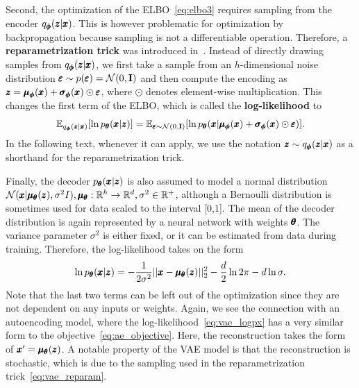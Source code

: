 Second, the optimization of the ELBO~\eqref{eq:elbo3} requires sampling from the encoder $q_{\pmb{{\phi}}}(\pmb{{z}}|\pmb{{x}})$. This is however problematic for optimization by backpropagation because sampling is not a differentiable operation. Therefore, a \textbf{reparametrization trick} was introduced in~\cite{kingma2013vae}. Instead of directly drawing samples from $q_{\pmb{{\phi}}}(\pmb{{z}}|\pmb{{x}})$, we first take a sample from an $h$-dimensional noise distribution $\pmb{{\varepsilon}}\sim p(\pmb{{\varepsilon}})=\mathcal{N}(0,\mathbf{I})$ and then compute the encoding as $\pmb{{z}}=\pmb{{\mu}}_{\pmb{{\phi}}}(\pmb{{x}})+\pmb{{\sigma}}_{\pmb{{\phi}}}(\pmb{{x}}) \odot \pmb{{\varepsilon}}$, where $\odot$ denotes element-wise multiplication. This changes the first term of the ELBO, which is called the \textbf{log-likelihood} to
\begin{equation} \label{eq:vae_reparam}
\mathbb{E}_{q_{\vc{\phi}}(\vc{z}|\vc{x})}\left[\ln p_{\vc{\theta}}(\vc{x}|\vc{z})\right] = \mathbb{E}_{\vc{\varepsilon}\sim\mathcal{N}(0,\textbf{I})}\left[\ln p_{\vc{\theta}}(\vc{x}| \vc{\mu}_{\vc{\phi}}(\vc{x})+\vc{\sigma}_{\vc{\phi}}(\vc{x}) \odot \vc{\varepsilon} )\right].
\end{equation}
In the following text, whenever it can apply, we use the notation $\pmb{{z}} \sim q_{\pmb{{\phi}}}(\pmb{{z}}|\pmb{{x}})$ as a shorthand for the reparametrization trick.

Finally, the decoder $p_{\pmb{{\theta}}}(\pmb{{x}}|\pmb{{z}})$ is also assumed to model a normal distribution\\ $\mathcal{N}(\pmb{{x}}|\pmb{{\mu}}_{\pmb{{\theta}}}(\pmb{{z}}),\sigma^2 I), \pmb{{\mu}}_{\pmb{{\theta}}} :\mathbb{R}^h \rightarrow \mathbb{R}^d, \sigma^2\in\mathbb{R}^+$, although a Bernoulli distribution is sometimes used for data scaled to the interval [0,1]. The mean of the decoder distribution is again represented by a neural network with weights $\pmb{{\theta}}$. The variance parameter $\sigma^2$ is either fixed, or it can be estimated from data during training. Therefore, the log-likelihood takes on the form 
\begin{equation} \label{eq:vae_logpx}
\ln p_{\pmb{{\theta}}}(\pmb{{x}}|\pmb{{z}}) = - \frac{1}{2\sigma^2} \vert \vert \pmb{{x}} - \pmb{{\mu}}_{\pmb{{\theta}}}(\pmb{{z}}) \vert \vert_2^2 - \frac{d}{2} \ln 2\pi - d \ln \sigma. 
\end{equation}
Note that the last two terms can be left out of the optimization since they are not dependent on any inputs or weights. Again, we see the connection with an autoencoding model, where the log-likelihood~\eqref{eq:vae_logpx} has a very similar form to the objective~\eqref{eq:ae_objective}. Here, the reconstruction takes the form of $\pmb{{x}}' = \pmb{{\mu}}_{\pmb{{\theta}}}(\pmb{{z}})$. A notable property of the VAE model is that the reconstruction is stochastic, which is due to the sampling used in the reparametrization trick~\eqref{eq:vae_reparam}. 

